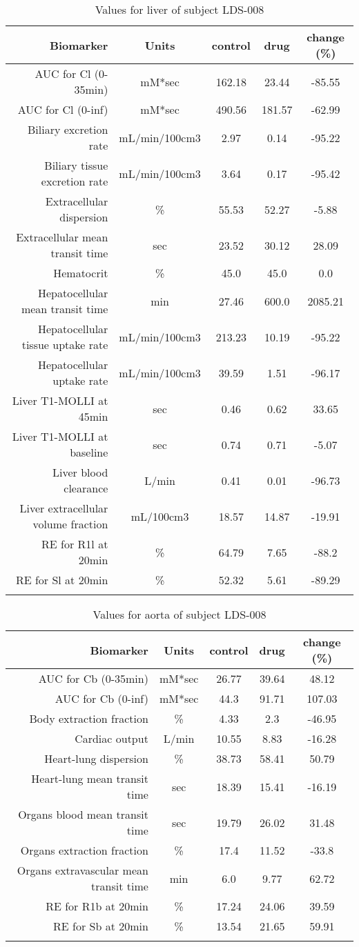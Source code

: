 \documentclass{epflreport}%
\begin{document}
%
\clearpage%
\begin{longtable}{rcccc}%
\hline%
Biomarker&Units&control&drug&change (\%)\\%
\hline%
AUC for Cl (0{-}35min)&mM*sec&162.18&23.44&{-}85.55\\%
AUC for Cl (0{-}inf)&mM*sec&490.56&181.57&{-}62.99\\%
Biliary excretion rate&mL/min/100cm3&2.97&0.14&{-}95.22\\%
Biliary tissue excretion rate&mL/min/100cm3&3.64&0.17&{-}95.42\\%
Extracellular dispersion&\%&55.53&52.27&{-}5.88\\%
Extracellular mean transit time&sec&23.52&30.12&28.09\\%
Hematocrit&\%&45.0&45.0&0.0\\%
Hepatocellular mean transit time&min&27.46&600.0&2085.21\\%
Hepatocellular tissue uptake rate&mL/min/100cm3&213.23&10.19&{-}95.22\\%
Hepatocellular uptake rate&mL/min/100cm3&39.59&1.51&{-}96.17\\%
Liver T1{-}MOLLI at 45min&sec&0.46&0.62&33.65\\%
Liver T1{-}MOLLI at baseline&sec&0.74&0.71&{-}5.07\\%
Liver blood clearance&L/min&0.41&0.01&{-}96.73\\%
Liver extracellular volume fraction&mL/100cm3&18.57&14.87&{-}19.91\\%
RE for R1l at 20min&\%&64.79&7.65&{-}88.2\\%
RE for Sl at 20min&\%&52.32&5.61&{-}89.29\\%
\hline%
\caption{Values for liver of subject LDS-008} \\%
\end{longtable}%
\begin{longtable}{rcccc}%
\hline%
Biomarker&Units&control&drug&change (\%)\\%
\hline%
AUC for Cb (0{-}35min)&mM*sec&26.77&39.64&48.12\\%
AUC for Cb (0{-}inf)&mM*sec&44.3&91.71&107.03\\%
Body extraction fraction&\%&4.33&2.3&{-}46.95\\%
Cardiac output&L/min&10.55&8.83&{-}16.28\\%
Heart{-}lung dispersion&\%&38.73&58.41&50.79\\%
Heart{-}lung mean transit time&sec&18.39&15.41&{-}16.19\\%
Organs blood mean transit time&sec&19.79&26.02&31.48\\%
Organs extraction fraction&\%&17.4&11.52&{-}33.8\\%
Organs extravascular mean transit time&min&6.0&9.77&62.72\\%
RE for R1b at 20min&\%&17.24&24.06&39.59\\%
RE for Sb at 20min&\%&13.54&21.65&59.91\\%
\hline%
\caption{Values for aorta of subject LDS-008} \\%
\end{longtable}%
\clearpage%
\end{document}
